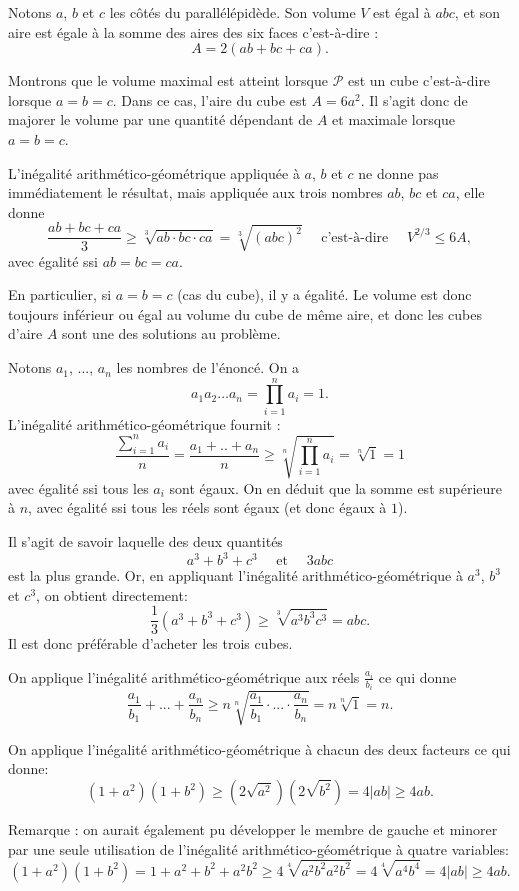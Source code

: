 \begin{Soln}{60}
Notons $a$, $b$ et $c$ les côtés du parallélépidède. Son volume $V$ est égal à $abc$, et son aire est égale à la somme des aires des six faces c'est-à-dire :
\[ A = 2(ab+bc+ca).\]

Montrons que le volume maximal est atteint lorsque $\mathcal P$ est un cube c'est-à-dire lorsque $a=b=c$. Dans ce cas, l'aire du cube est $A=6a^2$. Il s'agit donc de majorer le volume par une quantité dépendant de $A$ et maximale lorsque $a=b=c$.

L'inégalité arithmético-géométrique appliquée à $a$, $b$ et $c$ ne donne pas immédiatement le résultat, mais appliquée aux trois nombres $ab$, $bc$ et $ca$, elle  donne
 \[  \frac{ab+bc+ca}{3}  \geq \sqrt[3]{ab\cdot bc\cdot ca}=\sqrt[3]{(abc)^2}
 \quad \text{ c'est-à-dire } \quad
V^{2/3} \leq 6A, \]
 avec égalité ssi $ab=bc=ca$.

En particulier, si $a=b=c$ (cas du cube), il y a égalité. Le volume est donc toujours inférieur ou égal au volume du cube de même aire, et donc les cubes d'aire $A$ sont une des solutions au problème.
\end{Soln}
\begin{Soln}{61}
Notons $a_1$, ..., $a_n$ les nombres de l'énoncé. On a
\[
a_1 a_2 \dots a_n =  \prod_{i=1}^n a_i=1.\]
L'inégalité arithmético-géométrique fournit :
\[ \frac{\sum_{i=1}^n a_i}{n} = \frac{a_1+..+a_n}{n}\geq \sqrt[n]{\prod_{i=1}^n a_i} = \sqrt[n]{1}=1\]
avec égalité ssi tous les $a_i$ sont égaux. On en déduit que la somme est supérieure à $n$, avec égalité ssi tous les réels sont égaux (et donc égaux à  $1$).
\end{Soln}
\begin{Soln}{62}
Il s'agit de savoir laquelle des deux quantités
\[
a^3+b^3+c^3 \quad
\text{ et } \quad
3abc
\]
est la plus grande.
Or, en appliquant l'inégalité arithmético-géométrique à $a^3$, $b^3$ et $c^3$, on obtient directement:
\[
\frac13\left(  a^3+b^3+c^3\right)
\geq
\sqrt[3]{a^3b^3c^3} = abc.
\]
Il est donc préférable d'acheter les trois cubes.
\end{Soln}
\begin{Soln}{63}
On applique l'inégalité arithmético-géométrique aux réels $\frac{a_i}{b_i}$ ce qui donne
\[ \frac{a_1}{b_1} + ... + \frac{a_n}{b_n}
\geq n\sqrt[n]{\frac{a_1}{b_1} \cdot ... \cdot \frac{a_n}{b_n}}
=n \sqrt[n]{1}=n.
\]
\end{Soln}
\begin{Soln}{64}
On applique l'inégalité arithmético-géométrique à chacun des deux facteurs ce qui donne:
\[
(1+a^2)(1+b^2) \geq
(2\sqrt{a^2})(2\sqrt{b^2})
= 4|ab| \geq  4ab.
\]

Remarque : on aurait également pu développer le membre de gauche et minorer par une seule utilisation de l'inégalité arithmético-géométrique à quatre variables:
\[
(1+a^2)(1+b^2)
=1+a^2+b^2+a^2b^2
\geq
4\sqrt[4]{a^2b^2a^2b^2} =4\sqrt[4]{a^4b^4}
= 4|ab| \geq 4ab.
\]
\end{Soln}
